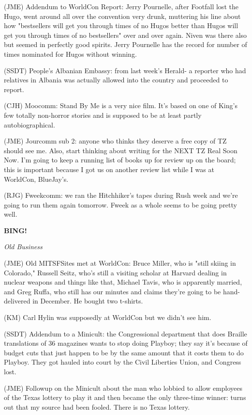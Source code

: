\documentclass[12pt]{article}
\newcommand{\bing}{{\bf BING!} }
\newcommand{\goto}[1]{\bing \vskip 12pt \centerline{{\em{#1}}}}
\begin{document}
(JME) Addendum to WorldCon Report: Jerry Pournelle, after Footfall lost the Hugo, went around all over the convention very drunk, muttering his line about how "bestsellers will get you through times of no Hugos better than Hugos will get you through times of no bestsellers" over and over again. Niven was there also but seemed in perfectly good spirits. Jerry Pournelle has the record for number of times nominated for Hugos without winning.

(SSDT) People's Albanian Embassy: from last week's Herald- a reporter who had relatives in Albania was actually allowed into the country and proceeded to report.

(CJH) Moocomm: Stand By Me is a very nice film. It's based on one of King's few totally non-horror stories and is supposed to be at least partly autobiographical.

(JME) Jourcomm sub 2: anyone who thinks they deserve a free copy of TZ should see me. Also, start thinking about writing for the NEXT TZ Real Soon Now. I'm going to keep a running list of books up for review up on the board; this is important because I got us on another review list while I was at WorldCon, BlueJay's.

(RJG) Fweekcomm: we ran the Hitchhiker's tapes during Rush week and we're going to run them again tomorrow. Fweek as a whole seems to be going pretty well.

\goto{Old Business}

(JME) Old MITSFSites met at WorldCon: Bruce Miller, who is "still skiing in Colorado," Russell Seitz, who's still a visiting scholar at Harvard dealing in nuclear weapons and things like that, Michael Tavis, who is apparently married, and Greg Ruffa, who still has our minutes and claims they're going to be hand-delivered in December. He bought two t-shirts.

(KM) Carl Hylin was supposedly at WorldCon but we didn't see him.

(SSDT) Addendum to a Minicult: the Congressional department that does Braille translations of 36 magazines wants to stop doing Playboy; they say it's because of budget cuts that just happen to be by the same amount that it costs them to do Playboy. They got hauled into court by the Civil Liberties Union, and Congress lost.

(JME) Followup on the Minicult about the man who lobbied to allow employees of the Texas lottery to play it and then became the only three-time winner: turns out that my source had been fooled. There is no Texas lottery.
\end{document}

